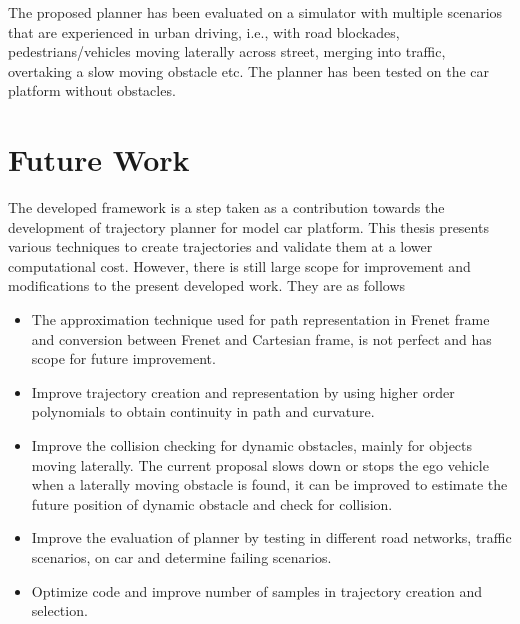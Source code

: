 The proposed planner has been evaluated on a simulator with multiple scenarios that are experienced in urban driving, i.e., with road blockades, pedestrians/vehicles moving laterally across street, merging into traffic, overtaking a slow moving obstacle etc. The planner has been tested on the car platform without obstacles. 

\section{Future Work}
The developed framework is a step taken as a contribution towards the development of trajectory planner for model car platform. This thesis presents various techniques to create trajectories and validate them at a lower computational cost. However, there is still large scope for improvement and modifications to the present developed work. They are as follows

\begin{itemize}
	\item The approximation technique used for path representation in Frenet frame and conversion between Frenet and Cartesian frame, is not perfect and has scope for future improvement. 
	\item Improve trajectory creation and representation by using higher order polynomials to obtain continuity in path and curvature. 
	\item Improve the collision checking for dynamic obstacles, mainly for objects moving laterally. The current proposal slows down or stops the ego vehicle when a laterally moving obstacle is found, it can be improved to estimate the future position of dynamic obstacle and check for collision. 
	\item Improve the evaluation of planner by testing in different road networks, traffic scenarios, on car and determine failing scenarios. 
	\item Optimize code and improve number of samples in trajectory creation and selection. 
	
\end{itemize}







